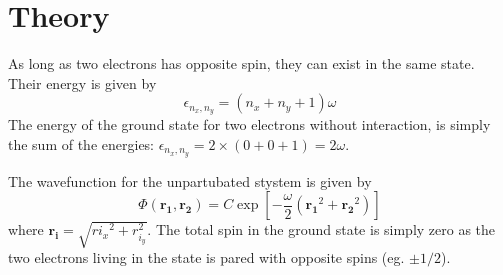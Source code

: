 
\section{Theory}
As long as two electrons has opposite spin, they can exist in the same state. Their energy is given by $$\epsilon_{n_x,n_y} = (n_x + n_y + 1)\omega$$ The energy of the ground state for two electrons without interaction, is simply the sum of the energies:  $\epsilon_{n_x,n_y} = 2\times (0 + 0 + 1) =  2\omega$. 

The wavefunction for the unpartubated stystem is given by
$$
\Phi (\mathbf{r_1}, \mathbf{r_2} ) = C \exp{[-\frac{\omega}{2}(\mathbf{r_1}^2 + \mathbf{r_2}^2)]}
$$
where $\mathbf{r_i} = \sqrt{r{i_x}^2 + r_{i_y}^2}$.  The total spin in the ground state is simply zero as the two electrons living in the state is pared with opposite spins (eg. $\pm 1/2$). 
